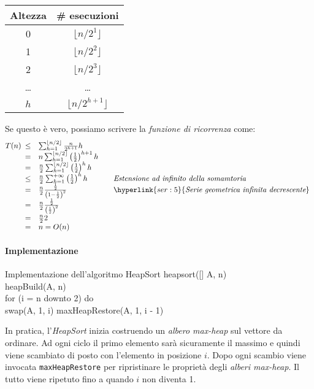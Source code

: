 \begin{table}[h!]
    \centering
    \renewcommand{\arraystretch}{1.2}
    \begin{tabular}{|c|c|}
        \hline
        \textbf{Altezza} & \textbf{\# esecuzioni}\\
        \hline
        0 & $\lfloor n/2^1\rfloor$\\
        \hline
        1 & $\lfloor n/2^2\rfloor$\\
        \hline
        2 & $\lfloor n/2^3\rfloor$\\
        \hline
        \dots & \dots\\
        \hline
        $h$ & $\lfloor n/2^{h+1}\rfloor$\\
        \hline
    \end{tabular}
\end{table}\noindent
Se questo è vero, possiamo scrivere la \emph{funzione di ricorrenza} come:
\[T(n)\begin{array}[t]{cll}
    \leq & \sum_{h=1}^{\lfloor n/2\rfloor}\frac{n}{2^{h+1}}h\\
    = & n\sum_{h=1}^{\lfloor n/2\rfloor}\left(\frac{1}{2}\right)^{h+1}h\\
    = & \frac{n}{2}\sum_{h=1}^{\lfloor n/2\rfloor}\left(\frac{1}{2}\right)^{h}h\\
    \leq & \frac{n}{2}\sum_{h=1}^{+\infty}\left(\frac{1}{2}\right)^{h}h & \quad\emph{Estensione ad infinito della somamtoria}\\
    = & \frac{n}{2}\frac{\frac{1}{2}}{\left(1-\frac{1}{2}\right)^2} & \quad\hyperlink{ser:5}{\emph{Serie geometrica infinita decrescente}}\\
    = & \frac{n}{2}\frac{\frac{1}{2}}{\left(\frac{1}{2}\right)^2}\\
    = & \frac{n}{2}2\\
    = & n = O(n)
\end{array}\]

\paragraph{Implementazione}
\begin{minicode}{Implementazione dell'algoritmo HeapSort}
    \ind heapsort([] A,  n)\\
        heapBuild(A, n)\\
        \indf for (i = n downto 2) do\\
            swap(A, 1, i)\hfill{}
            maxHeapRestore(A, 1, i - 1)\hfill{}
\end{minicode}\noindent
In pratica, l'\emph{HeapSort} inizia costruendo un \emph{albero max-heap} sul
vettore da ordinare. Ad ogni ciclo il primo elemento sarà sicuramente il
massimo e quindi viene scambiato di posto con l'elemento in posizione $i$.
Dopo ogni scambio viene invocata \texttt{maxHeapRestore} per ripristinare le
proprietà degli \emph{alberi max-heap}. Il tutto viene ripetuto fino a quando
$i$ non diventa 1.

